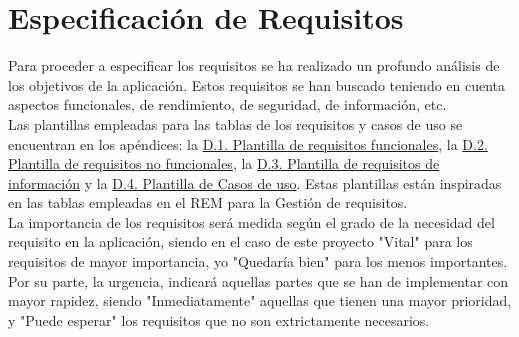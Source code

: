 \chapter{Especificación de Requisitos}
\label{enlaceespecificacion}

Para proceder a especificar los requisitos se ha realizado un profundo análisis de los objetivos de la aplicación. Estos requisitos se han buscado teniendo en cuenta aspectos funcionales, de rendimiento, de seguridad, de información, etc.
\\

Las plantillas empleadas para las tablas de los requisitos y casos de uso se encuentran en los apéndices: la \hyperref[enlaceFRQX]{D.1. Plantilla de requisitos funcionales}, la \hyperref[enlaceNFRX]{D.2. Plantilla de requisitos no funcionales}, la \hyperref[enlaceIRQX]{D.3. Plantilla de requisitos de información} y la \hyperref[enlaceUCX]{D.4. Plantilla de Casos de uso}.
Estas plantillas están inspiradas en las tablas empleadas en el REM \cite{rem} para la Gestión de requisitos.
\\

La importancia de los requisitos será medida según el grado de la necesidad del requisito en la aplicación, siendo en el caso de este proyecto "Vital" para los requisitos de mayor importancia, yo "Quedaría bien" para los menos importantes. Por su parte, la urgencia, indicará aquellas partes que se han de implementar con mayor rapidez, siendo "Inmediatamente" aquellas que tienen una mayor prioridad, y "Puede esperar" los requisitos que no son extrictamente necesarios.






